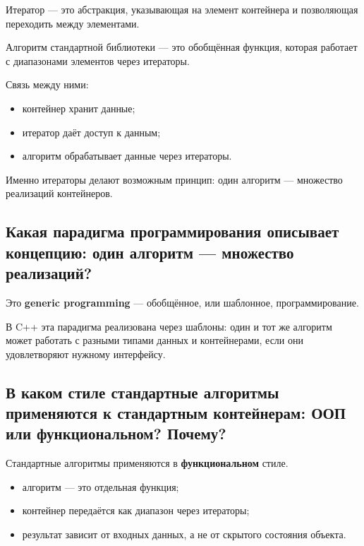 \begin{definition}[Итератор]
Итератор — это абстракция, указывающая на элемент контейнера и позволяющая переходить между элементами.
\end{definition}

\begin{definition}[Алгоритм]
Алгоритм стандартной библиотеки — это обобщённая функция, которая работает с диапазонами элементов через итераторы.
\end{definition}

Связь между ними:
\begin{itemize}
    \item контейнер хранит данные;
    \item итератор даёт доступ к данным;
    \item алгоритм обрабатывает данные через итераторы.
\end{itemize}

\begin{remark}
Именно итераторы делают возможным принцип: один алгоритм — множество реализаций контейнеров.
\end{remark}

\subsection{Какая парадигма программирования описывает концепцию: один алгоритм — множество реализаций?}
Это \textbf{generic programming} — обобщённое, или шаблонное, программирование.

\begin{remark}
В C++ эта парадигма реализована через шаблоны: один и тот же алгоритм может работать с разными типами данных и контейнерами, если они удовлетворяют нужному интерфейсу.
\end{remark}

\subsection{В каком стиле стандартные алгоритмы применяются к стандартным контейнерам: ООП или функциональном? Почему?}
Стандартные алгоритмы применяются в \textbf{функциональном} стиле.

\begin{itemize}
    \item алгоритм — это отдельная функция;
    \item контейнер передаётся как диапазон через итераторы;
    \item результат зависит от входных данных, а не от скрытого состояния объекта.
\end{itemize}

